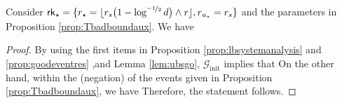 \begin{corollary}
\label{cor:Tbadbound}
Consider  $\mathsf{rk}_{\star} =   \{ r_{\star} = 
\lfloor  r_s \big(1 -  \log^{\nicefrac{-1}{2}} d \big) \wedge r \rfloor, r_{u_\star} =  r_s  \}$ and the parameters in Proposition   \ref{prop:Tbadboundaux}. We have
\end{corollary} 
 
\begin{proof}
By using the first items in Proposition \ref{prop:lbsystemanalysis} and \ref{prop:goodeventres} ,and Lemma \ref{lem:ubsgo},  $\mathcal{G}_{\text{init}}$ implies that
On the other hand,  within the (negation) of the events given in Proposition \ref{prop:Tbadboundaux}, we have
Therefore, the statement follows.
\end{proof}

 

